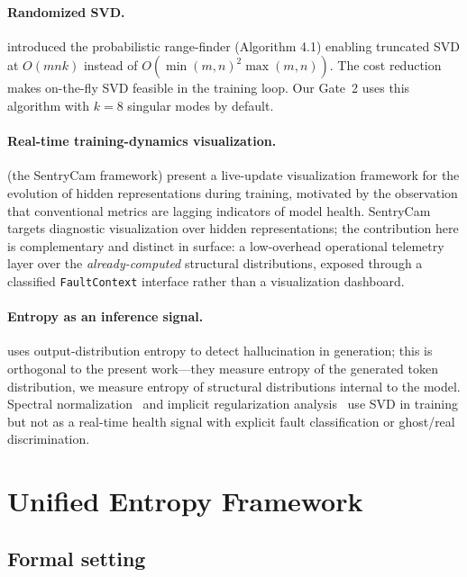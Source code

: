 \documentclass[11pt,a4paper]{article}
\theoremstyle{plain}
\begin{document}
\paragraph{Randomized SVD.}
\citet{halko2011finding} introduced the probabilistic range-finder
(Algorithm 4.1) enabling truncated SVD at $O(mnk)$ instead of
$O(\min(m,n)^2 \max(m,n))$.
The cost reduction makes on-the-fly SVD feasible in the training loop.
Our Gate~2 uses this algorithm with $k = 8$ singular modes by default.

\paragraph{Real-time training-dynamics visualization.}
\citet{yang2024neural} (the SentryCam framework) present a live-update
visualization framework for the evolution of hidden representations
during training, motivated by the observation that conventional
metrics are lagging indicators of model health.
SentryCam targets diagnostic visualization over hidden representations;
the contribution here is complementary and distinct in surface: a
low-overhead operational telemetry layer over the \emph{already-computed}
structural distributions, exposed through a classified
\texttt{FaultContext} interface rather than a visualization dashboard.

\paragraph{Entropy as an inference signal.}
\citet{manakul2023selfcheckgpt} uses output-distribution entropy to
detect hallucination in generation; this is orthogonal to the present
work---they measure entropy of the generated token distribution, we
measure entropy of structural distributions internal to the model.
Spectral normalization~\citep{miyato2018spectral} and implicit
regularization analysis~\citep{arora2019implicit} use SVD in training
but not as a real-time health signal with explicit fault classification
or ghost/real discrimination.


\section{Unified Entropy Framework}
\label{sec:framework}

\subsection{Formal setting}
\label{sec:formal}
\end{document}
